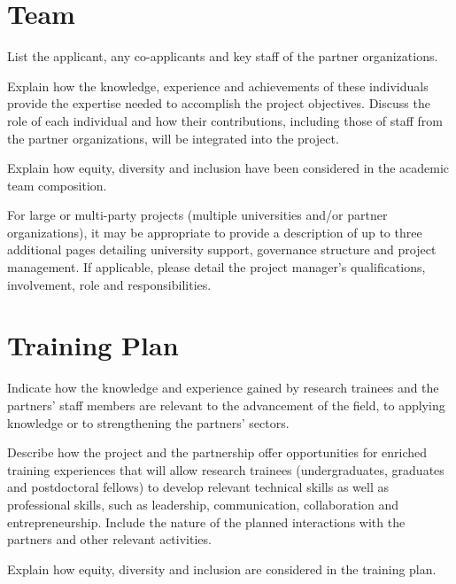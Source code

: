 \documentclass[french]{nserc-alliance}
\begin{document}
\section*{Team}
\ifinst\begin{instructions}
\item List the applicant, any co-applicants and key staff of the partner organizations.
\item Explain how the knowledge, experience and achievements of these individuals provide the expertise needed to accomplish the project objectives. Discuss the role of each individual and how their contributions, including those of staff from the partner organizations, will be integrated into the project.
\item Explain how equity, diversity and inclusion have been considered in the academic team composition.
\item For large or multi-party projects (multiple universities and/or partner organizations), it may be appropriate to provide a description of up to three additional pages detailing university support, governance structure and project management. If applicable, please detail the project manager’s qualifications, involvement, role and responsibilities.
\end{instructions}\fi

\section*{Training Plan}
\ifinst\begin{instructions}
\item Indicate how the knowledge and experience gained by research trainees and the partners’ staff members are relevant to the advancement of the field, to applying knowledge or to strengthening the partners’ sectors.
\item Describe how the project and the partnership offer opportunities for enriched training experiences that will allow research trainees (undergraduates, graduates and postdoctoral fellows) to develop relevant technical skills as well as professional skills, such as leadership, communication, collaboration and entrepreneurship. Include the nature of the planned interactions with the partners and other relevant activities.
\item Explain how equity, diversity and inclusion are considered in the training plan.
\end{instructions}\fi
\end{document}

